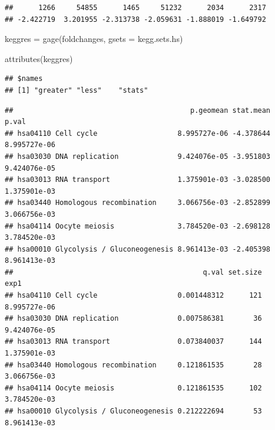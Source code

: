 \documentclass[
]{article}
\newenvironment{Shaded}{\begin{snugshade}}{\end{snugshade}}
\newcommand{\AttributeTok}[1]{\textcolor[rgb]{0.77,0.63,0.00}{#1}}
\newcommand{\FunctionTok}[1]{\textcolor[rgb]{0.00,0.00,0.00}{#1}}
\newcommand{\NormalTok}[1]{#1}
\newcommand{\OtherTok}[1]{\textcolor[rgb]{0.56,0.35,0.01}{#1}}
\newcommand{\SpecialCharTok}[1]{\textcolor[rgb]{0.00,0.00,0.00}{#1}}
\begin{document}
\begin{verbatim}
##      1266     54855      1465     51232      2034      2317 
## -2.422719  3.201955 -2.313738 -2.059631 -1.888019 -1.649792
\end{verbatim}

\begin{Shaded}
\begin{Highlighting}[]
\NormalTok{keggres }\OtherTok{=} \FunctionTok{gage}\NormalTok{(foldchanges, }\AttributeTok{gsets =}\NormalTok{ kegg.sets.hs)}
\end{Highlighting}
\end{Shaded}

\begin{Shaded}
\begin{Highlighting}[]
\FunctionTok{attributes}\NormalTok{(keggres)}
\end{Highlighting}
\end{Shaded}

\begin{verbatim}
## $names
## [1] "greater" "less"    "stats"
\end{verbatim}

\begin{Shaded}
\end{Shaded}

\begin{verbatim}
##                                          p.geomean stat.mean        p.val
## hsa04110 Cell cycle                   8.995727e-06 -4.378644 8.995727e-06
## hsa03030 DNA replication              9.424076e-05 -3.951803 9.424076e-05
## hsa03013 RNA transport                1.375901e-03 -3.028500 1.375901e-03
## hsa03440 Homologous recombination     3.066756e-03 -2.852899 3.066756e-03
## hsa04114 Oocyte meiosis               3.784520e-03 -2.698128 3.784520e-03
## hsa00010 Glycolysis / Gluconeogenesis 8.961413e-03 -2.405398 8.961413e-03
##                                             q.val set.size         exp1
## hsa04110 Cell cycle                   0.001448312      121 8.995727e-06
## hsa03030 DNA replication              0.007586381       36 9.424076e-05
## hsa03013 RNA transport                0.073840037      144 1.375901e-03
## hsa03440 Homologous recombination     0.121861535       28 3.066756e-03
## hsa04114 Oocyte meiosis               0.121861535      102 3.784520e-03
## hsa00010 Glycolysis / Gluconeogenesis 0.212222694       53 8.961413e-03
\end{verbatim}
\end{document}
